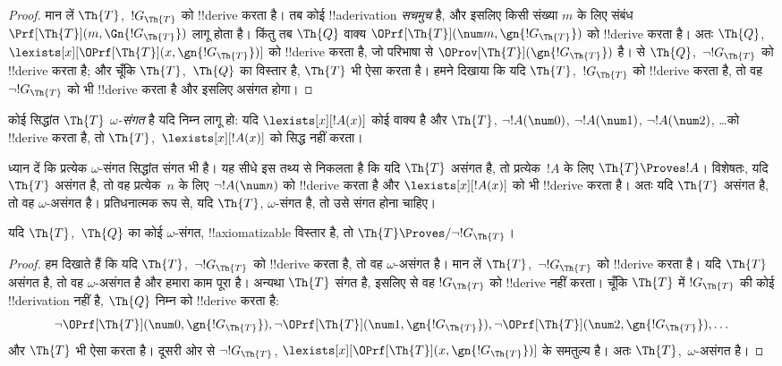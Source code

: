 \documentclass[../../../include/open-logic-section]{subfiles}
\begin{document}
\begin{proof}
मान लें $\Th{T}$,~$!G_\Th{T}$ को !!{derive} करता है। तब कोई
!!a{derivation} \emph{सचमुच} है, और इसलिए किसी संख्या $m$ के लिए संबंध
$\Prf[\Th{T}](m, \Gn{!G_\Th{T}})$ लागू होता है। किंतु तब $\Th{Q}$ वाक्य
$\OPrf[\Th{T}](\num m, \gn{!G_\Th{T}})$ को !!{derive} करता है। अतः
$\Th{Q}$,~$\lexists[x][\OPrf[\Th{T}](x,\gn{!G_\Th{T}})]$ को !!{derive}
करता है, जो परिभाषा से $\OProv[\Th{T}](\gn{!G_\Th{T}})$ है।
 से $\Th{Q}$,~$\lnot !G_\Th{T}$ को !!{derive} करता है;
और चूँकि $\Th{T}$,~$\Th{Q}$ का विस्तार है, $\Th{T}$ भी ऐसा करता है। हमने
दिखाया कि यदि $\Th{T}$,~$!G_\Th{T}$ को !!{derive} करता है, तो वह
$\lnot !G_\Th{T}$ को भी !!{derive} करता है और इसलिए असंगत होगा।
\end{proof}

\begin{defn}
कोई सिद्धांत $\Th{T}$ \emph{$\omega$-संगत} है यदि निम्न लागू हो: यदि
$\lexists[x][!A(x)]$ कोई वाक्य है और $\Th{T}$,
$\lnot !A(\num 0)$, $\lnot !A(\num 1)$, $\lnot !A(\num 2)$, \dots को
!!{derive} करता है, तो $\Th{T}$,~$\lexists[x][!A(x)]$ को सिद्ध नहीं करता।
\end{defn}

ध्यान दें कि प्रत्येक $\omega$-संगत सिद्धांत संगत भी है। यह सीधे इस तथ्य
से निकलता है कि यदि $\Th{T}$ असंगत है, तो प्रत्येक~$!A$ के लिए
$\Th{T} \Proves !A$। विशेषतः, यदि $\Th{T}$ असंगत है, तो वह प्रत्येक~$n$
के लिए $\lnot !A(\num n)$ को !!{derive} करता है और
$\lexists[x][!A(x)]$ को भी !!{derive} करता है। अतः यदि $\Th{T}$ असंगत है,
तो वह $\omega$-असंगत है। प्रतिधनात्मक रूप से, यदि $\Th{T}$,
$\omega$-संगत है, तो उसे संगत होना चाहिए।

\begin{lem}
यदि $\Th{T}$,~$\Th{Q}$ का कोई $\omega$-संगत, !!{axiomatizable} विस्तार
है, तो $\Th{T} \Proves/ \lnot !G_\Th{T}$।
\end{lem}

\begin{proof}
हम दिखाते हैं कि यदि $\Th{T}$,~$\lnot !G_\Th{T}$ को !!{derive} करता है,
तो वह $\omega$-असंगत है। मान लें $\Th{T}$,~$\lnot !G_\Th{T}$ को
!!{derive} करता है। यदि $\Th{T}$ असंगत है, तो वह $\omega$-असंगत है और
हमारा काम पूरा है। अन्यथा $\Th{T}$ संगत है, इसलिए
 से वह $!G_\Th{T}$ को !!{derive} नहीं करता। चूँकि
$\Th{T}$ में $!G_\Th{T}$ की कोई !!{derivation} नहीं है, $\Th{Q}$ निम्न को
!!{derive} करता है:
\[
\lnot \OPrf[\Th{T}](\num 0, \gn{!G_\Th{T}}), \lnot \OPrf[\Th{T}](\num 1,
\gn{!G_\Th{T}}), \lnot \OPrf[\Th{T}](\num 2, \gn{!G_\Th{T}}), \dots
\]
और $\Th{T}$ भी ऐसा करता है। दूसरी ओर  से
$\lnot !G_\Th{T}$,
$\lexists[x][\OPrf[\Th{T}](x,\gn{!G_\Th{T}})]$ के समतुल्य है। अतः
$\Th{T}$,~$\omega$-असंगत है।
\end{proof}
\end{document}
